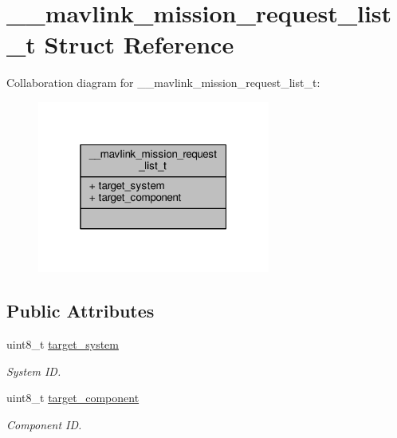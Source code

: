 \hypertarget{struct____mavlink__mission__request__list__t}{\section{\+\_\+\+\_\+mavlink\+\_\+mission\+\_\+request\+\_\+list\+\_\+t Struct Reference}
\label{struct____mavlink__mission__request__list__t}
}


Collaboration diagram for \+\_\+\+\_\+mavlink\+\_\+mission\+\_\+request\+\_\+list\+\_\+t\+:
\nopagebreak
\begin{figure}[H]
\begin{center}
\leavevmode
\includegraphics[width=217pt]{struct____mavlink__mission__request__list__t__coll__graph}
\end{center}
\end{figure}
\subsection*{Public Attributes}
\begin{DoxyCompactItemize}
\item 
\hypertarget{struct____mavlink__mission__request__list__t_ae8b0c8bffa1ecde59f37cdf8b65f47d4}{uint8\+\_\+t \hyperlink{struct____mavlink__mission__request__list__t_ae8b0c8bffa1ecde59f37cdf8b65f47d4}{target\+\_\+system}}\label{struct____mavlink__mission__request__list__t_ae8b0c8bffa1ecde59f37cdf8b65f47d4}

\begin{DoxyCompactList}\small\item\em System I\+D. \end{DoxyCompactList}\item 
\hypertarget{struct____mavlink__mission__request__list__t_a8214615734dcc050fdcd5ccaad31b550}{uint8\+\_\+t \hyperlink{struct____mavlink__mission__request__list__t_a8214615734dcc050fdcd5ccaad31b550}{target\+\_\+component}}\label{struct____mavlink__mission__request__list__t_a8214615734dcc050fdcd5ccaad31b550}

\begin{DoxyCompactList}\small\item\em Component I\+D. \end{DoxyCompactList}\end{DoxyCompactItemize}


